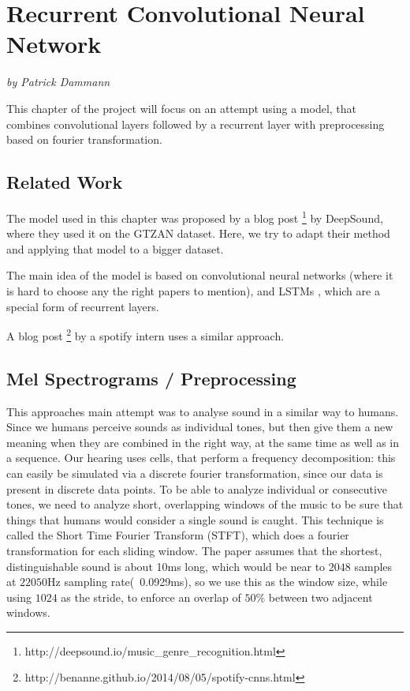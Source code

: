 \def\code#1{\mbox{\texttt{#1}}}


\chapter{Recurrent Convolutional Neural Network}
\textit{by Patrick Dammann}

\bigskip

This chapter of the project will focus on an attempt using a model, that combines convolutional layers followed by a recurrent layer with preprocessing based on fourier transformation.

\section{Related Work}
\label{sec:rcnn-related}
The model used in this chapter was proposed by a blog post
\footnote{http://deepsound.io/music\_genre\_recognition.html}
by DeepSound, where they used it on the GTZAN \cite{1021072} dataset. Here, we try to adapt their method and applying that model to a bigger dataset.

The main idea of the model is based on convolutional neural networks (where it is hard to choose any the right papers to mention), and LSTMs \cite{Hochreiter:1997:LSM:1246443.1246450}, which are a special form of recurrent layers.

A blog post \footnote{http://benanne.github.io/2014/08/05/spotify-cnns.html} by a spotify intern uses a similar approach.

\section{Mel Spectrograms / Preprocessing}
\label{sec:rcnn-mels}

This approaches main attempt was to analyse sound in a similar way to humans. Since we humans perceive sounds as individual tones, but then give them a new meaning when they are combined in the right way, at the same time as well as in a sequence. Our hearing uses cells, that perform a frequency decomposition: this can easily be simulated via a discrete fourier transformation, since our data is present in discrete data points. To be able to analyze individual or consecutive tones, we need to analyze short, overlapping windows of the music to be sure that things that humans would consider a single sound is caught. This technique is called the Short Time Fourier Transform (STFT), which does a fourier transformation for each sliding window. The paper assumes that the shortest, distinguishable sound is about 10ms long, which would be near to $2048$ samples at $22050$Hz sampling rate(~0.0929ms), so we use this as the window size, while using $1024$ as the stride, to enforce an overlap of $50\%$ between two adjacent windows.


